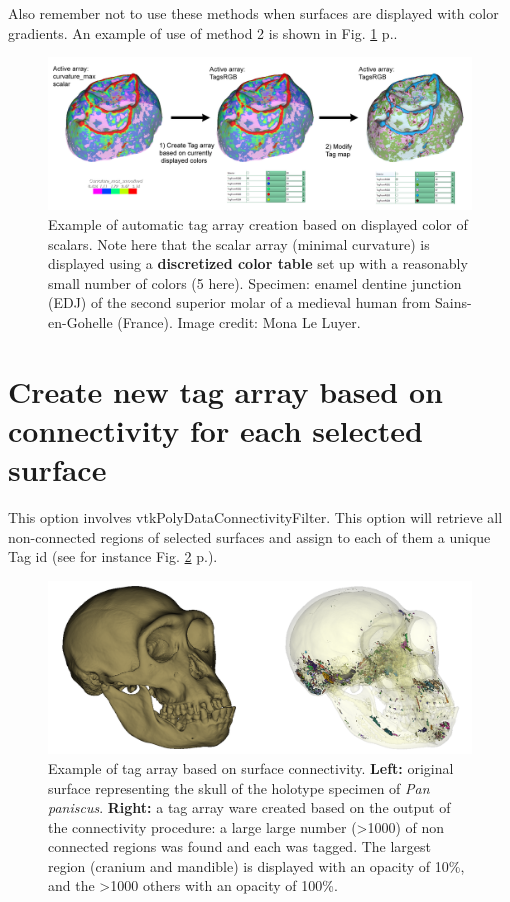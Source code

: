 Also remember not to use these methods when surfaces are displayed with color gradients. An example of use of method 2 is shown in Fig. \ref{rgb_conversion_example} p.\pageref{rgb_conversion_example}.


\begin{figure}
  \centering
  \includegraphics[scale=0.2]{images/12/tags_from_rgb_example.png} 
	\caption{Example of automatic tag array creation based on displayed color of scalars. Note here that the scalar array (minimal curvature) is displayed using a \textbf{discretized color table} set up with a reasonably small number of colors (5 here). Specimen: enamel dentine junction (EDJ) of the second superior molar of a medieval human from Sains-en-Gohelle (France). Image credit: Mona Le Luyer.}
\label{rgb_conversion_example}
\end{figure}


\section{Create new tag array based on connectivity for each selected surface}

This option involves vtkPolyDataConnectivityFilter. This option will retrieve all non-connected regions of selected surfaces and assign to each of them a unique Tag id (see for instance Fig. \ref{tag_connected} p.\pageref{tag_connected}).
\begin{figure}
  \centering
  \includegraphics[scale=0.28]{images/12/connectivity_tags.png} 
	\caption{Example of tag array based on surface connectivity. \textbf{Left:} original surface representing the skull of the holotype specimen of \textit{Pan paniscus}. \textbf{Right:} a tag array ware created based on the output of the connectivity procedure: a large large number (>1000) of non connected regions was found and each was tagged. The largest region (cranium and mandible) is displayed with an opacity of 10\%, and the >1000 others with an opacity of 100\%. }
\label{tag_connected}
 
\end{figure}

